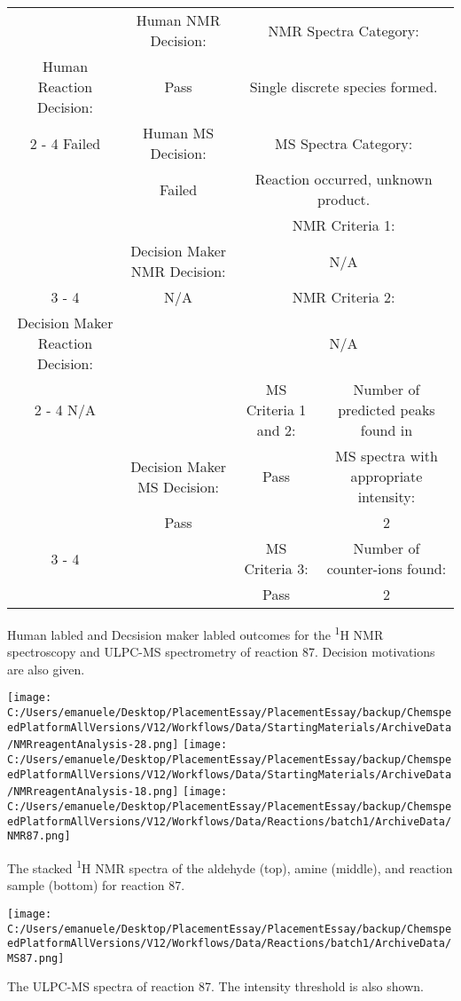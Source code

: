 \documentclass{article}%
\begin{document}
\begin{Decision Table}[H]%
\begin{tabular}{|c|c|c|c|}%
\hline%
&Human NMR Decision:&\multicolumn{2}{|c|}{NMR Spectra Category:}\\%
Human Reaction Decision:&Pass&\multicolumn{2}{|c|}{Single discrete species formed.}\\%
\cline{2%
-%
4}%
Failed&Human MS Decision:&\multicolumn{2}{|c|}{MS Spectra Category:}\\%
&Failed&\multicolumn{2}{|c|}{Reaction occurred, unknown product.}\\%
\hline%
&&\multicolumn{2}{|c|}{NMR Criteria 1:}\\%
&Decision Maker NMR Decision:&\multicolumn{2}{|c|}{N/A}\\%
\cline{3%
-%
4}%
&N/A&\multicolumn{2}{|c|}{NMR Criteria 2:}\\%
Decision Maker Reaction Decision:&&\multicolumn{2}{|c|}{N/A}\\%
\cline{2%
-%
4}%
N/A&&MS Criteria 1 and 2:&Number of predicted peaks found in\\%
&Decision Maker MS Decision:&Pass&MS spectra with appropriate intensity:\\%
&Pass&&2\\%
\cline{3%
-%
4}%
&&MS Criteria 3:&Number of counter{-}ions found:\\%
&&Pass&2\\%
\hline%
\end{tabular}%
\caption{Human labled and Decsision maker labled outcomes for the \textsuperscript{1}H NMR spectroscopy and ULPC-MS spectrometry of reaction 87. Decision motivations are also given.}%
\end{Decision Table}%
\begin{NMR Spectra}[H]%
\begin{center}%
\texttt{[image: C:/Users/emanuele/Desktop/PlacementEssay/PlacementEssay/backup/ChemspeedPlatformAllVersions/V12/Workflows/Data/StartingMaterials/ArchiveData/NMRreagentAnalysis-28.png]}\hfill%
\texttt{[image: C:/Users/emanuele/Desktop/PlacementEssay/PlacementEssay/backup/ChemspeedPlatformAllVersions/V12/Workflows/Data/StartingMaterials/ArchiveData/NMRreagentAnalysis-18.png]}\hfill%
\texttt{[image: C:/Users/emanuele/Desktop/PlacementEssay/PlacementEssay/backup/ChemspeedPlatformAllVersions/V12/Workflows/Data/Reactions/batch1/ArchiveData/NMR87.png]}\hfill%
\end{center}%
\caption{The stacked \textsuperscript{1}H NMR spectra of the aldehyde (top), amine (middle), and reaction sample (bottom) for reaction 87.}%
\end{NMR Spectra}%
\begin{MS Spectra}[H]%
\begin{center}%
\texttt{[image: C:/Users/emanuele/Desktop/PlacementEssay/PlacementEssay/backup/ChemspeedPlatformAllVersions/V12/Workflows/Data/Reactions/batch1/ArchiveData/MS87.png]}\hfill%
\end{center}%
\caption{The ULPC-MS spectra of reaction 87. The intensity threshold is also shown.}%
\end{MS Spectra}%
\end{document}
